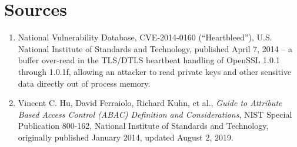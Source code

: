 \section*{Sources}
\begin{enumerate}[label=\lbrack\arabic*\rbrack, leftmargin=2.2em]
\item {}National Vulnerability Database, CVE-2014-0160 (``Heartbleed''), U.S. National
Institute of Standards and Technology, published April 7, 2014 -- a buffer over-read in the TLS/DTLS
heartbeat handling of OpenSSL 1.0.1 through 1.0.1f, allowing an attacker to read private keys and
other sensitive data directly out of process memory.
\item {}Vincent C. Hu, David Ferraiolo, Richard Kuhn, et al., \emph{Guide to Attribute
Based Access Control (ABAC) Definition and Considerations}, NIST Special Publication 800-162,
National Institute of Standards and Technology, originally published January 2014, updated August
2, 2019.
\end{enumerate}
